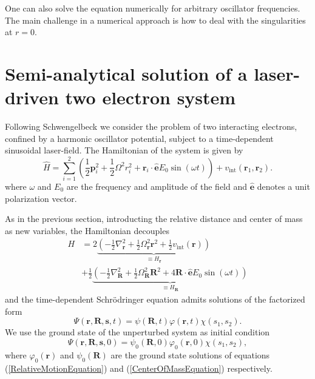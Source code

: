 \documentclass[aip,jcp,reprint,floatfix]{revtex4-1}
\begin{document}
\begin{appendices}
One can also solve the equation numerically for arbitrary oscillator frequencies. The main challenge in a numerical approach is how to deal with the singularities at $r=0$.

\section{Semi-analytical solution of a laser-driven two electron system}
Following Schwengelbeck \cite{SCHWENGELBECK_1999} we consider the problem of two interacting electrons, confined by a harmonic oscillator potential, subject to a time-dependent sinusoidal laser-field. The Hamiltonian of the system is given by 
\begin{equation}
    \hat{H} = \sum_{i=1}^2 \left(\frac{1}{2} \mathbf{p}_i^2 + \frac{1}{2} \Omega^2 r_i^2 + \mathbf{r}_i \cdot \hat{\mathbf{e}} E_0 \sin(\omega t)  \right) + v_{\text{int}}(\mathbf{r}_1,\mathbf{r}_2). 
\end{equation}
where $\omega$ and $E_0$ are the frequency and amplitude of the field and $\hat{\mathbf{e}}$ denotes a unit polarization vector.

As in the previous section, introducting the relative distance and center of mass as new variables, the Hamiltonian decouples
\begin{align}
    H &= 2 \underbrace{\left( -\frac{1}{2} \nabla_\mathbf{r}^2 + \frac{1}{2} \Omega_\mathbf{r}^2 \mathbf{r}^2 + \frac{1}{2}v_{\text{int}}(\mathbf{r}) \right)}_{\equiv H_\mathbf{r}} \nonumber \\  &+ \frac{1}{2} \underbrace{\left( -\frac{1}{2}\nabla_\mathbf{R}^2 + \frac{1}{2}\Omega_\mathbf{R}^2 \mathbf{R}^2 + 4\mathbf{R} \cdot \hat{\mathbf{e}} E_0 \sin(\omega t) \right)}_{\equiv H_\mathbf{R}}
\end{align}
and the time-dependent Schrödringer equation admits solutions of the factorized form\cite{SCHWENGELBECK_1999}
\begin{equation}
    \Psi(\mathbf{r},\mathbf{R},\mathbf{s},t) = \psi(\mathbf{R},t) \varphi(\mathbf{r},t) \chi(s_1,s_2).
\end{equation}
We use the ground state of the unperturbed system as initial condition
\begin{equation}
    \Psi(\mathbf{r},\mathbf{R},\mathbf{s},0) = \psi_0(\mathbf{R},0) \varphi_0(\mathbf{r},0) \chi(s_1,s_2),
\end{equation}
where $\varphi_0(\mathbf{r})$ and $\psi_0(\mathbf{R})$ are the ground state solutions of equations (\ref{RelativeMotionEquation}) and (\ref{CenterOfMassEquation}) respectively.


\end{appendices}
\end{document}
